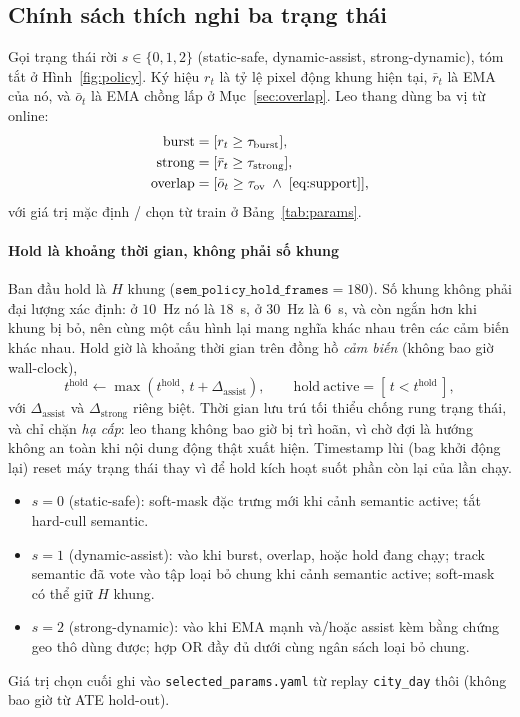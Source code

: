 \documentclass{ieeeaccess}
\begin{document}
\subsection{Chính sách thích nghi ba trạng thái}
\label{sec:policy}
Gọi trạng thái rời \(s\in\{0,1,2\}\) (static-safe, dynamic-assist, strong-dynamic), tóm tắt ở Hình~\ref{fig:policy}.
Ký hiệu \(r_t\) là tỷ lệ pixel động khung hiện tại, \(\bar{r}_t\) là EMA của nó, và \(\bar{o}_t\) là EMA chồng lấp ở Mục~\ref{sec:overlap}.
Leo thang dùng ba vị từ online:
\begin{align}
\mathrm{burst} &= [r_t \ge \tau_{\mathrm{burst}}], \\
\mathrm{strong} &= [\bar{r}_t \ge \tau_{\mathrm{strong}}], \\
\mathrm{overlap} &= [\bar{o}_t \ge \tau_{\mathrm{ov}} \;\wedge\; \eqref{eq:support}],
\end{align}
với giá trị mặc định / chọn từ train ở Bảng~\ref{tab:params}.

\paragraph{Hold là khoảng thời gian, không phải số khung}
Ban đầu hold là \(H\) khung (\(\texttt{sem\_policy\_hold\_frames}{=}180\)). Số khung không phải đại lượng xác định: ở \(10\)~Hz nó là \(18\)~s, ở \(30\)~Hz là \(6\)~s, và còn ngắn hơn khi khung bị bỏ, nên cùng một cấu hình lại mang nghĩa khác nhau trên các cảm biến khác nhau. Hold giờ là khoảng thời gian trên đồng hồ \emph{cảm biến} (không bao giờ wall-clock),
\begin{equation}
\label{eq:hold}
t^{\mathrm{hold}} \leftarrow \max\!\left(t^{\mathrm{hold}},\, t + \Delta_{\mathrm{assist}}\right),\qquad
\mathrm{hold\ active} = \left[\,t < t^{\mathrm{hold}}\,\right],
\end{equation}
với \(\Delta_{\mathrm{assist}}\) và \(\Delta_{\mathrm{strong}}\) riêng biệt. Thời gian lưu trú tối thiểu chống rung trạng thái, và chỉ chặn \emph{hạ cấp}: leo thang không bao giờ bị trì hoãn, vì chờ đợi là hướng không an toàn khi nội dung động thật xuất hiện. Timestamp lùi (bag khởi động lại) reset máy trạng thái thay vì để hold kích hoạt suốt phần còn lại của lần chạy.
\begin{itemize}
\item \(s{=}0\) (static-safe): soft-mask đặc trưng mới khi cảnh semantic active; tắt hard-cull semantic.
\item \(s{=}1\) (dynamic-assist): vào khi burst, overlap, hoặc hold đang chạy; track semantic đã vote vào tập loại bỏ chung khi cảnh semantic active; soft-mask có thể giữ \(H\) khung.
\item \(s{=}2\) (strong-dynamic): vào khi EMA mạnh và/hoặc assist kèm bằng chứng geo thô dùng được; hợp OR đầy đủ dưới cùng ngân sách loại bỏ chung.
\end{itemize}
Giá trị chọn cuối ghi vào \texttt{selected\_params.yaml} từ replay \texttt{city\_day} thôi (không bao giờ từ ATE hold-out).
\end{document}
